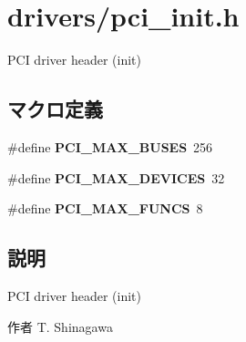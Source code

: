 \section{drivers/pci\-\_\-init.h}
\label{pci__init_8h}


\-P\-C\-I driver header (init)  


\subsection*{マクロ定義}
\begin{DoxyCompactItemize}
\item 
\#define {\bfseries \-P\-C\-I\-\_\-\-M\-A\-X\-\_\-\-B\-U\-S\-E\-S}~256\label{pci__init_8h_a5f2c53dbe30f05e12e6ad5c04e8f2dd1}

\item 
\#define {\bfseries \-P\-C\-I\-\_\-\-M\-A\-X\-\_\-\-D\-E\-V\-I\-C\-E\-S}~32\label{pci__init_8h_ac92b961e4ae0fbfdb814592b74fa3229}

\item 
\#define {\bfseries \-P\-C\-I\-\_\-\-M\-A\-X\-\_\-\-F\-U\-N\-C\-S}~8\label{pci__init_8h_a3d41896412fa051ee9ab75394a590c74}

\end{DoxyCompactItemize}


\subsection{説明}
\-P\-C\-I driver header (init) \begin{DoxyAuthor}{作者}
\-T. \-Shinagawa 
\end{DoxyAuthor}
